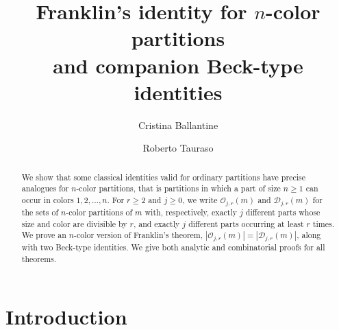 \documentclass[reqno,12pt]{amsart}
\theoremstyle{definition}
\begin{document}
\title[Franklin and Beck-type identities for $n$-color partitions]{Franklin's identity for $n$-color partitions\\ and companion Beck-type identities}

\author[C. Ballantine]{Cristina Ballantine}

\address{Department of Mathematics and Computer Science\\ 
College of the Holy Cross \\ Worcester, MA 01610, USA} 

\author[R. Tauraso]{Roberto Tauraso}

\address{Dipartimento di Matematica, 
Università di Roma ``Tor Vergata'', 00133 Roma, Italy}





\begin{abstract} We show that some classical identities valid for ordinary partitions have precise analogues for $n$-color partitions, that is partitions in which a part of size $n\geq 1$ can occur in colors $1, 2, \ldots, n$.
For $r \ge 2$ and $j \ge 0$, we write $\mathcal{O}_{j,r}(m)$ and $\mathcal{D}_{j,r}(m)$ for the sets of $n$-color partitions of $m$ with, respectively, exactly $j$ different parts whose size and color are divisible by $r$, and exactly $j$ different parts occurring at least $r$ times. We prove an $n$-color version of Franklin's theorem, $|\mathcal{O}_{j,r}(m)| = |\mathcal{D}_{j,r}(m)|$, along with two Beck-type identities. We give both analytic and combinatorial proofs for all theorems.  
\end{abstract}

\maketitle

\section{Introduction}
\end{document}

